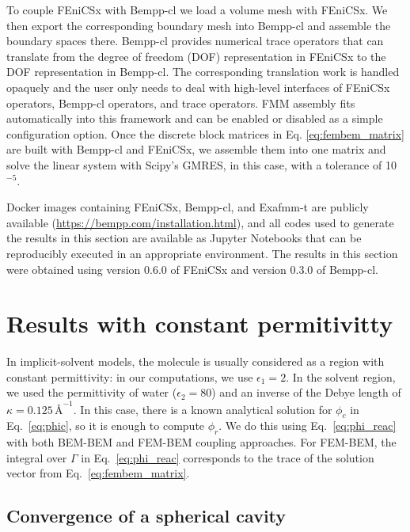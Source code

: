 To couple FEniCSx with Bempp-cl we load a volume mesh with FEniCSx. We then export the corresponding boundary mesh into Bempp-cl and assemble the boundary spaces there. Bempp-cl provides numerical trace operators that can translate from the degree of freedom (DOF) representation in FEniCSx to the DOF representation in Bempp-cl. The corresponding translation work is handled opaquely and the user only needs to deal with high-level interfaces of FEniCSx operators, Bempp-cl operators, and trace operators. FMM assembly fits automatically into this framework and can be enabled or disabled as a simple configuration option.
Once the discrete block matrices in Eq. \eqref{eq:fembem_matrix} are built with Bempp-cl and FEniCSx, we assemble them into one matrix and solve the linear system with Scipy's\cite{2020SciPy-NMeth} GMRES, in this case, with a tolerance of 10$^{-5}$.

Docker images containing FEniCSx, Bempp-cl, and Exafmm-t are publicly available (\href{https://bempp.com/installation.html}{https://bempp.com/installation.html}), and all codes used to generate the results in this section are available as Jupyter Notebooks that can be reproducibly executed in an appropriate environment. The results in this section were obtained using version 0.6.0 of FEniCSx and version 0.3.0 of Bempp-cl.

\section*{\sffamily \Large Results with constant permitivitty}

In implicit-solvent models, the molecule is usually considered as a region with constant permittivity: in our computations, we use $\epsilon_1=2$.
In the solvent region, we used the permittivity of water ($\epsilon_2=80$) and an inverse of the Debye length of $\kappa=0.125\,\text{\AA}^{-1}$.
In this case, there is a known analytical solution for $\phi_c$ in Eq.~\eqref{eq:phic}, so it is enough to compute $\phi_r$. We do this using Eq.~\eqref{eq:phi_reac} with both BEM-BEM and FEM-BEM coupling approaches. For FEM-BEM, the integral over $\Gamma$ in Eq.~\eqref{eq:phi_reac} corresponds to the trace of the solution vector from Eq.~\eqref{eq:fembem_matrix}.

\subsection*{\sffamily \large Convergence of a spherical cavity}

